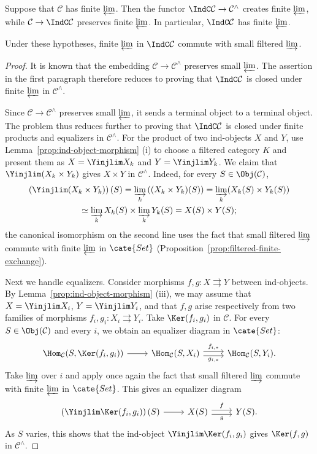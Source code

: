 \begin{lemma}\label{prop:Ind-lim}
	Suppose that $\mathcal{C}$ has finite $\varprojlim$. Then the functor $\IndC\mathcal{C}\to\mathcal{C}^\wedge$ creates finite $\varprojlim$, while $\mathcal{C}\to\IndC\mathcal{C}$ preserves finite $\varprojlim$. In particular, $\IndC\mathcal{C}$ has finite $\varprojlim$.

	Under these hypotheses, finite $\varprojlim$ in $\IndC\mathcal{C}$ commute with small filtered $\varinjlim$.
\end{lemma}
\begin{proof}
	It is known that the embedding $\mathcal{C}\to\mathcal{C}^\wedge$ preserves small $\varprojlim$. The assertion in the first paragraph therefore reduces to proving that $\IndC\mathcal{C}$ is closed under finite $\varprojlim$ in $\mathcal{C}^\wedge$.

	Since $\mathcal{C}\to\mathcal{C}^\wedge$ preserves small $\varprojlim$, it sends a terminal object to a terminal object. The problem thus reduces further to proving that $\IndC\mathcal{C}$ is closed under finite products and equalizers in $\mathcal{C}^\wedge$. For the product of two ind-objects $X$ and $Y$, use Lemma~\ref{prop:ind-object-morphism} (i) to choose a filtered category $K$ and present them as $X=\Yinjlim X_k$ and $Y=\Yinjlim Y_k$. We claim that $\Yinjlim(X_k\times Y_k)$ gives $X\times Y$ in $\mathcal{C}^\wedge$. Indeed, for every $S\in\Obj(\mathcal{C})$,
	\begin{multline*}
		\left(\Yinjlim (X_k \times Y_k)\right)(S) = \varinjlim_k \left((X_k \times Y_k)(S)\right) = \varinjlim_k (X_k(S) \times Y_k(S)) \\
		\simeq \varinjlim_k X_k(S) \times \varinjlim_k Y_k(S) = X(S) \times Y(S);
	\end{multline*}
	the canonical isomorphism on the second line uses the fact that small filtered $\varinjlim$ commute with finite $\varprojlim$ in $\cate{Set}$ (Proposition~\ref{prop:filtered-finite-exchange}).

	Next we handle equalizers. Consider morphisms $f,g:X\rightrightarrows Y$ between ind-objects. By Lemma~\ref{prop:ind-object-morphism} (iii), we may assume that $X=\Yinjlim X_i$, $Y=\Yinjlim Y_i$, and that $f,g$ arise respectively from two families of morphisms $f_i,g_i:X_i\rightrightarrows Y_i$. Take $\Ker(f_i,g_i)$ in $\mathcal{C}$. For every $S\in\Obj(\mathcal{C})$ and every $i$, we obtain an equalizer diagram in $\cate{Set}$:
	\[\begin{tikzcd}
		\Hom_{\mathcal{C}}(S, \Ker(f_i, g_i)) \arrow[r] & \Hom_{\mathcal{C}}(S, X_i) \arrow[r, shift left, "{f_{i, *}}"] \arrow[r, shift right, "{g_{i, *}}"'] & \Hom_{\mathcal{C}}(S, Y_i).
	\end{tikzcd}\]
	Take $\varinjlim$ over $i$ and apply once again the fact that small filtered $\varinjlim$ commute with finite $\varprojlim$ in $\cate{Set}$. This gives an equalizer diagram
	\[\begin{tikzcd}
		\left(\Yinjlim \Ker(f_i, g_i)\right)(S) \arrow[r] & X(S) \arrow[r, shift left, "f"] \arrow[r, shift right, "g"'] & Y(S).
	\end{tikzcd}\]
	As $S$ varies, this shows that the ind-object $\Yinjlim\Ker(f_i,g_i)$ gives $\Ker(f,g)$ in $\mathcal{C}^\wedge$.


\end{proof}
